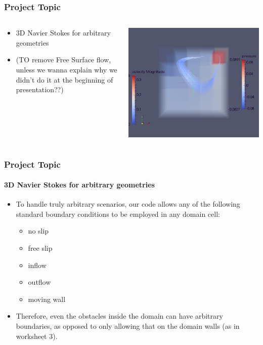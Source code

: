 \documentclass{beamer}
\begin{document}
\begin{frame}
\frametitle{Project Topic}

\begin{columns}
\begin{column}{0.48\textwidth}
\begin{itemize}
\item 3D Navier Stokes for arbitrary geometries
\item (TO remove Free Surface flow, unless we wanna explain why we didn't do it at the beginning of presentation??)
\end{itemize} \end{column}
\begin{column}{0.48\textwidth}
\includegraphics[height = 0.45\textheight]{simpleCavity.png}
\end{column}
\end{columns}
\end{frame}

\begin{frame}
\frametitle{Project Topic}
\framesubtitle{3D Navier Stokes for arbitrary geometries}

\begin{itemize}
\item To handle truly arbitrary scenarios, our code allows any of the following standard boundary conditions to be employed in any domain cell:
\begin{itemize}
\item no slip
\item free slip
\item inflow
\item outflow
\item moving wall
\end{itemize}
\item Therefore, even the obstacles inside the domain can have arbitrary boundaries, as opposed to only allowing that on the domain walls (as in worksheet 3).
\end{itemize}
\end{frame}
\end{document}
